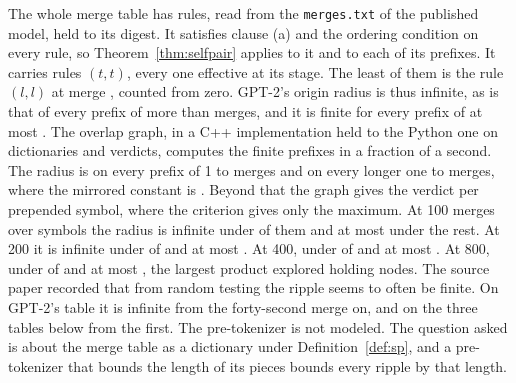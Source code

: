 \documentclass[11pt,a4paper]{article}
\theoremstyle{definition}
\theoremstyle{plain}
\newcommand{\code}[1]{\texttt{#1}}
\begin{document}
The whole merge table has \GptRules{} rules, read from the \code{merges.txt} of the published model, held to its digest.
It satisfies clause (a) and the ordering condition on every rule, so Theorem~\ref{thm:selfpair} applies to it and to
each of its prefixes. It carries \GptSelfPairs{} rules \((t, t)\), every one effective at its stage. The least of them
is the rule \((l, l)\) at merge \GptFinitePrefix{}, counted from zero. GPT-2's origin radius is thus infinite, as is
that of every prefix of more than \GptFinitePrefix{} merges, and it is finite for every prefix of at most
\GptFinitePrefix{}. The overlap graph, in a C++ implementation held to the Python one on \CppDictionaries{} dictionaries
and \CppVerdicts{} verdicts, computes the finite prefixes in a fraction of a second. The radius is \GptRadiusEarly{} on
every prefix of 1 to \GptRadiusEarlyLast{} merges and \GptRadiusLate{} on every longer one to \GptFinitePrefix{} merges,
where the mirrored constant is \GptMirroredFortyOne{}. Beyond that the graph gives the verdict per prepended symbol,
where the criterion gives only the maximum. At 100 merges over \GptSymbolsHundred{} symbols the radius is infinite under
\GptInfiniteHundred{} of them and at most \GptMaxFiniteHundred{} under the rest. At 200 it is infinite under
\GptInfiniteTwoHundred{} of \GptSymbolsTwoHundred{} and at most \GptMaxFiniteTwoHundred{}. At 400, under
\GptInfiniteFourHundred{} of \GptSymbolsFourHundred{} and at most \GptMaxFiniteFourHundred{}. At 800, under
\GptInfiniteEightHundred{} of \GptSymbolsEightHundred{} and at most \GptMaxFiniteEightHundred{}, the largest product
explored holding \GptNodesEightHundred{} nodes. The source paper recorded that from random testing the ripple seems to
often be finite. On GPT-2's table it is infinite from the forty-second merge on, and on the three tables below from the
first. The pre-tokenizer is not modeled. The question asked is about the merge table as a dictionary under
Definition~\ref{def:sp}, and a pre-tokenizer that bounds the length of its pieces bounds every ripple by that length.
\end{document}
